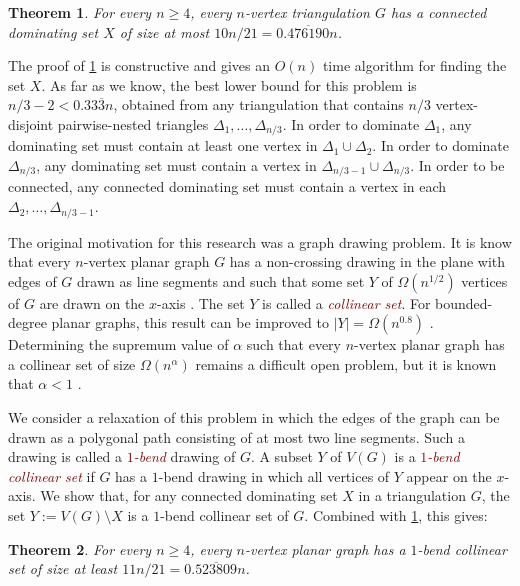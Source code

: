 \documentclass[12pt]{article}
\newtheorem{thm}{Theorem}
\newcommand{\defin}[1]{\emph{\textcolor{Maroon}{#1}}}
\theoremstyle{definition}
\begin{document}
\begin{thm}\label{main_result2}
  For every $n\ge 4$, every $n$-vertex triangulation $G$ has a connected dominating set $X$ of size at most $10n/21= 0.\overline{476190}n$.
\end{thm}

The proof of \cref{main_result2} is constructive and gives an $O(n)$ time algorithm for finding the set $X$.  As far as we know, the best lower bound for this problem is $n/3-2 < 0.33\overline{3} n$, obtained from any triangulation that contains $n/3$ vertex-disjoint pairwise-nested triangles $\Delta_1,\ldots,\Delta_{n/3}$.  In order to dominate $\Delta_1$, any dominating set must contain at least one vertex in $\Delta_1 \cup \Delta_2$. In order to dominate $\Delta_{n/3}$, any dominating set must contain a vertex in $\Delta_{n/3-1}\cup\Delta_{n/3}$.  In order to be connected, any connected dominating set must contain a vertex in each $\Delta_2,\ldots,\Delta_{n/3-1}$.

The original motivation for this research was a graph drawing problem.  It is know that every $n$-vertex planar graph $G$ has a non-crossing drawing in the plane with edges of $G$ drawn as line segments and such that some set $Y$ of $\Omega(n^{1/2})$ vertices of $G$ are drawn on the $x$-axis \cite{bose.dujmovic:polynomial,dujmovic:utility}.  The set $Y$ is called a \defin{collinear set}.  For bounded-degree planar graphs, this result can be improved to $|Y|=\Omega(n^{0.8})$ \cite{dujmovic.morin:dual}.  Determining the supremum value of $\alpha$ such that every $n$-vertex planar graph has a collinear set of size $\Omega(n^{\alpha})$ remains a difficult open problem, but it is known that $\alpha < 1$ \cite{ravsky.verbitsky:collinear}.

We consider a relaxation of this problem in which the edges of the graph can be drawn as a polygonal path consisting of at most two line segments.  Such a drawing is called a \defin{$1$-bend} drawing of $G$.  A subset $Y$ of $V(G)$ is a \defin{$1$-bend collinear set} if $G$ has a $1$-bend drawing in which all vertices of $Y$ appear on the $x$-axis.  We show that, for any connected dominating set $X$ in a triangulation $G$, the set $Y:=V(G)\setminus X$ is a $1$-bend collinear set of $G$.  Combined with \cref{main_result2}, this gives:

\begin{thm}\label{one_bend_collinear}
  For every $n\ge 4$, every $n$-vertex planar graph has a $1$-bend collinear set of size at least $11n/21=0.\overline{523809}n$.
\end{thm}
\end{document}
